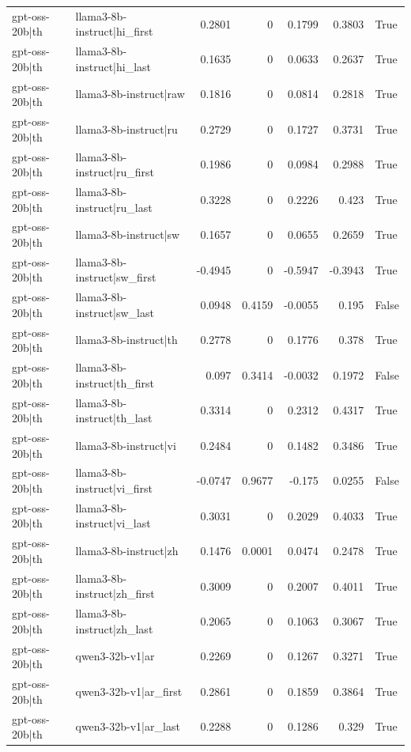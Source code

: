 \begin{table}
\begin{tabular}{l l r r r r l}
gpt-oss-20b|th & llama3-8b-instruct|hi_first & 0.2801 & 0 & 0.1799 & 0.3803 & True \\
gpt-oss-20b|th & llama3-8b-instruct|hi_last & 0.1635 & 0 & 0.0633 & 0.2637 & True \\
gpt-oss-20b|th & llama3-8b-instruct|raw & 0.1816 & 0 & 0.0814 & 0.2818 & True \\
gpt-oss-20b|th & llama3-8b-instruct|ru & 0.2729 & 0 & 0.1727 & 0.3731 & True \\
gpt-oss-20b|th & llama3-8b-instruct|ru_first & 0.1986 & 0 & 0.0984 & 0.2988 & True \\
gpt-oss-20b|th & llama3-8b-instruct|ru_last & 0.3228 & 0 & 0.2226 & 0.423 & True \\
gpt-oss-20b|th & llama3-8b-instruct|sw & 0.1657 & 0 & 0.0655 & 0.2659 & True \\
gpt-oss-20b|th & llama3-8b-instruct|sw_first & -0.4945 & 0 & -0.5947 & -0.3943 & True \\
gpt-oss-20b|th & llama3-8b-instruct|sw_last & 0.0948 & 0.4159 & -0.0055 & 0.195 & False \\
gpt-oss-20b|th & llama3-8b-instruct|th & 0.2778 & 0 & 0.1776 & 0.378 & True \\
gpt-oss-20b|th & llama3-8b-instruct|th_first & 0.097 & 0.3414 & -0.0032 & 0.1972 & False \\
gpt-oss-20b|th & llama3-8b-instruct|th_last & 0.3314 & 0 & 0.2312 & 0.4317 & True \\
gpt-oss-20b|th & llama3-8b-instruct|vi & 0.2484 & 0 & 0.1482 & 0.3486 & True \\
gpt-oss-20b|th & llama3-8b-instruct|vi_first & -0.0747 & 0.9677 & -0.175 & 0.0255 & False \\
gpt-oss-20b|th & llama3-8b-instruct|vi_last & 0.3031 & 0 & 0.2029 & 0.4033 & True \\
gpt-oss-20b|th & llama3-8b-instruct|zh & 0.1476 & 0.0001 & 0.0474 & 0.2478 & True \\
gpt-oss-20b|th & llama3-8b-instruct|zh_first & 0.3009 & 0 & 0.2007 & 0.4011 & True \\
gpt-oss-20b|th & llama3-8b-instruct|zh_last & 0.2065 & 0 & 0.1063 & 0.3067 & True \\
gpt-oss-20b|th & qwen3-32b-v1|ar & 0.2269 & 0 & 0.1267 & 0.3271 & True \\
gpt-oss-20b|th & qwen3-32b-v1|ar_first & 0.2861 & 0 & 0.1859 & 0.3864 & True \\
gpt-oss-20b|th & qwen3-32b-v1|ar_last & 0.2288 & 0 & 0.1286 & 0.329 & True \\

\end{tabular}
\end{table}
